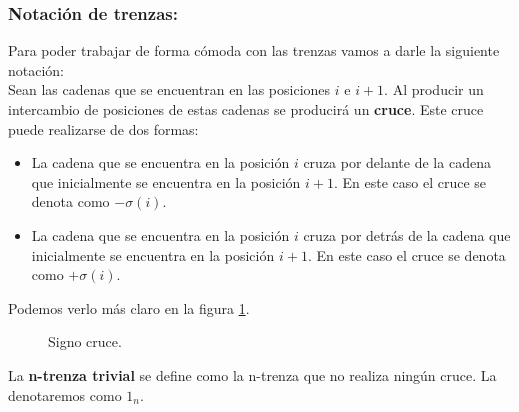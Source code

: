 \documentclass[14pt]{extarticle}
\begin{document}
 
\bigskip
\begin{center}
	\subsubsection{Notación de trenzas:}
\end{center}
Para poder trabajar de forma cómoda con las trenzas vamos a darle la siguiente notación:\\
Sean las cadenas que se encuentran en las posiciones $i$ e $i+1$. Al producir un intercambio de posiciones de estas cadenas se producirá un \textbf{cruce}. Este cruce puede realizarse de dos formas: 
\begin{itemize}
	\item La cadena que se encuentra en la posición $i$ cruza por delante de la cadena que inicialmente se encuentra en la posición $i+1$. En este caso el cruce se denota como $-\sigma(i)$.
	\item La cadena que se encuentra en la posición $i$ cruza por detrás de la cadena que inicialmente se encuentra en la posición $i+1$. En este caso el cruce se denota como $+\sigma(i)$.
\end{itemize}
Podemos verlo más claro en la figura \ref{tren4}.\\
   \begin{figure}[h!]
   	\centering
   	\space
   	\caption{Signo cruce.}
   	\label{tren4} 
   \end{figure}

La \textbf{n-trenza trivial} se define como la n-trenza que no realiza ningún cruce. La denotaremos como $1_{n}.$ \\
\end{document}
